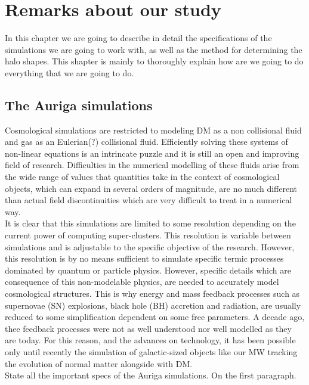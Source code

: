 \chapter{Remarks about our study}
In this chapter we are going to describe in detail the specifications of the simulations we are going to work with, as well as the method for determining the halo shapes. This shapter is mainly to thoroughly explain how are we going to do everything that we are going to do.\\

\section{The Auriga simulations}
Cosmological simulations are restricted to modeling DM as a non collisional fluid and gas as an Eulerian(?) collisional fluid. Efficiently solving these systems of non-linear equations is an intrincate puzzle and it is still an open and improving field of research. 
Difficulties in the numerical modelling of these fluids arise from the wide range of values that quantities take in the context of cosmological objects, which can expand in several orders of magnitude, are no much different than actual field discontinuities which are very difficult to treat in a numerical way.\\

It is clear that this simulations are limited to some resolution depending on the current power of computing super-clusters. This resolution is variable between simulations and is adjustable to the specific objective of the research. However, this resolution is by no means sufficient to simulate specific termic processes dominated by quantum or particle physics. However, specific details which are consequence of this non-modelable physics, are needed to accurately model cosmological structures. This is why energy and mass feedback processes such as supernovae (SN) explosions, black hole (BH) accretion and radiation, are usually reduced to some simplification dependent on some free parameters. A decade ago, thee feedback processes were not as well understood nor well modelled as they are today. For this reason, and the advances on technology, it has been possible only until recently the simulation of galactic-sized objects like our MW tracking the evolution of normal matter alongside with DM.\\


State all the important specs of the Auriga simulations. On the first paragraph.\\

